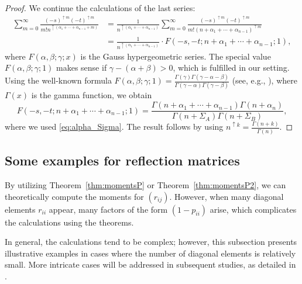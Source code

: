 \documentclass[10pt,a4paper]{amsart}
\numberwithin{equation}{section}
\theoremstyle{definition}
\begin{document}
\begin{proof}
We continue the calculations of the last series:
\begin{align*}
\sum_{m=0}^\infty \frac{(-s)^{\uparrow m}(-t)^{\uparrow m}}{m! n^{\uparrow (\alpha_1+ \cdots+ \alpha_{n-1}+m)}}
&=\frac{1}{n^{\uparrow (\alpha_1+\cdots+ \alpha_{n-1})}}
 \sum_{m=0}^\infty \frac{(-s)^{\uparrow m}(-t)^{\uparrow m}}{m! (n+\alpha_1+ \cdots+ \alpha_{n-1})^{\uparrow m}} \\
 &= \frac{1}{n^{\uparrow (\alpha_1+\cdots+ \alpha_{n-1})}} \cdot
 F(-s,-t;n+\alpha_1+ \cdots+ \alpha_{n-1};1),
\end{align*}
where $F(\alpha,\beta;\gamma;x)$ is the Gauss hypergeometric series.
The special value $F(\alpha,\beta;\gamma;1)$ makes sense if $\gamma-(\alpha+\beta)>0$, which is fulfilled in our setting.
Using the well-known formula $F(\alpha,\beta;\gamma;1)= \frac{\Gamma(\gamma) \Gamma(\gamma-\alpha-\beta)}{\Gamma(\gamma-\alpha)\Gamma(\gamma-\beta)}$ (see, e.g., \cite[Theorem 2.2.2]{AAR}),
where $\Gamma(x)$ is the gamma function,
we obtain
\[
F(-s,-t;n+\alpha_1+ \cdots+ \alpha_{n-1};1)
= \frac{\Gamma(n+\alpha_1+\cdots+\alpha_{n-1})\Gamma (n+\alpha_n)}{\Gamma(n+\Sigma_A) \Gamma(n+\Sigma_B)},
\]
where we used \eqref{eq:alpha_Sigma}.
The result follows by using $n^{\uparrow k}=\frac{\Gamma(n+k)}{\Gamma(n)}$.
\end{proof}

\subsection{Some examples for reflection matrices}

By utilizing Theorem~\ref{thm:momentsP} or Theorem~\ref{thm:momentsP2}, we can theoretically compute the moments for $(r_{ij})$.
However, when many diagonal elements $r_{ii}$ appear, many factors of the form $(1 - p_{ii})$ arise, which complicates the calculations using the theorems.

In general, the calculations tend to be complex; however, this subsection presents illustrative examples in cases where the number of diagonal elements is relatively small.
More intricate cases will be addressed in subsequent studies, as detailed in \cite{CardinCollinsMatsumoto}.
\end{document}
